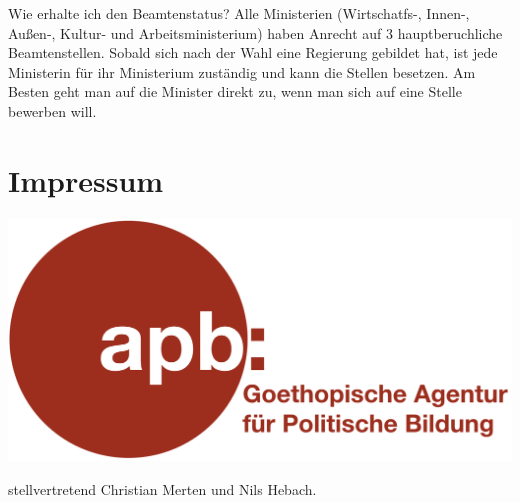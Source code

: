 \documentclass{sasbase}
\begin{document}
\begin{question}{Wie erhalte ich den Beamtenstatus?}
	Alle Ministerien (Wirtschatfs-, Innen-, Au{\ss}en-, Kultur- und Arbeitsministerium) haben Anrecht auf 3 hauptberuchliche Beamtenstellen. Sobald sich nach der Wahl eine Regierung gebildet hat, ist jede Ministerin f\"{u}r ihr Ministerium zust\"{a}ndig und kann die Stellen besetzen. Am Besten geht man auf die Minister direkt zu, wenn man sich auf eine Stelle bewerben will.
\end{question}


\section{Impressum}
\begin{minipage}{0.4\linewidth}
\includegraphics[width=\textwidth]{apb_icon.png}
\end{minipage}
\begin{minipage}{0.5\linewidth}
{\raggedright stellvertretend Christian Merten und Nils Hebach.}
\end{minipage}
\end{document}
